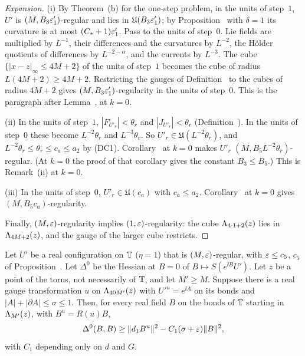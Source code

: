 \begin{proof}[Expansion]
(i) By Theorem~(b) for the one-step problem, in the units of step~$1$, $U'$ is $(M,B_3\varepsilon'_1)$-regular and lies in $\mathfrak U(B_3\varepsilon'_1)$; by Proposition~ with $\delta=1$ its curvature is at most $(C_*+1)\varepsilon'_1$. Pass to the units of step~$0$. Lie fields are multiplied by $L^{-1}$, their differences and the curvatures by $L^{-2}$, the H\"older quotients of differences by $L^{-2-\alpha}$, and the currents by $L^{-3}$. The cube $\{|x-z|_\infty\le4M+2\}$ of the units of step~$1$ becomes the cube of radius $L(4M+2)\ge4M+2$. Restricting the gauges of Definition~ to the cubes of radius $4M+2$ gives $(M,B_3\varepsilon'_1)$-regularity in the units of step~$0$. This is the paragraph after Lemma~, at $k=0$.

(ii) In the units of step~$1$, $|F_{U'_r}|<\theta_r$ and $|J_{U'_r}|<\theta_r$ (Definition~). In the units of step~$0$ these become $L^{-2}\theta_r$ and $L^{-3}\theta_r$. So $U'_r\in\mathfrak U(L^{-2}\theta_r)$, and $L^{-2}\theta_r\le\theta_r\le c_a\le a_2$ by (DC1). Corollary~ at $k=0$ makes $U'_r$ $(M,B_5L^{-2}\theta_r)$-regular. (At $k=0$ the proof of that corollary gives the constant $B_3\le B_5$.) This is Remark~(ii) at $k=0$.

(iii) In the units of step~$0$, $U'_r\in\mathfrak U(c_a)$ with $c_a\le a_2$. Corollary~ at $k=0$ gives $(M,B_5c_a)$-regularity.

Finally, $(M,\varepsilon)$-regularity implies $(1,\varepsilon)$-regularity: the cube $\Lambda_{4\cdot1+2}(z)$ lies in $\Lambda_{4M+2}(z)$, and the gauge of the larger cube restricts.
\end{proof}

\begin{detail}\label{xb:d-k0-hessian}
Let $U'$ be a real configuration on $\mathbb T$ ($\eta=1$) that is $(M,\varepsilon)$-regular, with $\varepsilon\le c_5$, $c_5$ of Proposition~. Let $\Delta^0$ be the Hessian at $B=0$ of $B\mapsto S(e^{\ii B}U')$. Let $z$ be a point of the torus, not necessarily of $\mathbb T$, and let $M'\ge M$. Suppose there is a real gauge transformation $u$ on $\Lambda_{40M'}(z)$ with $U'^u=e^{\ii A}$ on its bonds and $|A|+|\partial A|\le\sigma\le1$. Then, for every real field $B$ on the bonds of $\mathbb T$ starting in $\Lambda_{M'}(z)$, with $B^u=R(u)B$,
\[
\Delta^0(B,B)\ge\|d_1 B^u\|^2-C_1(\sigma+\varepsilon)\|B\|^2 ,
\]
with $C_1$ depending only on $d$ and $G$.
\end{detail}

